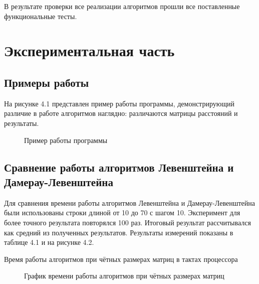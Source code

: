 \documentclass[12pt, a4paper]{report}
\begin{document}
	В результате проверки все реализации алгоритмов прошли все поставленные функциональные тесты.

	\chapter{Экспериментальная часть}
	\section{Примеры работы}
	На рисунке 4.1 представлен пример работы программы, демонстрирующий различие в работе алгоритмов наглядно: различаются матрицы расстояний и результаты.
	\begin{figure}[ht!]
		\centering
		\caption{Пример работы программы}
		\label{fig:example}
	\end{figure}
	
	\section{Сравнение работы алгоритмов Левенштейна и Дамерау-Левенштейна}
	Для сравнения времени работы алгоритмов Левенштейна и Дамерау-Левенштейна были использованы строки длиной от 10 до 70 с шагом 10. Эксперимент для более точного результата повторялся 100 раз. Итоговый результат рассчитывался как средний из полученных результатов. Результаты измерений показаны в таблице 4.1 и на рисунке 4.2.\\
	\begin{table}[ht!]
		\caption{Время работы алгоритмов при чётных размерах матриц в тактах процессора}
		\begin{center}
		\end{center}
	\end{table}
	
	\begin{figure}[ht!]
		\caption{График времени работы алгоритмов при чётных размерах матриц}
	\end{figure}
	
\end{document}
